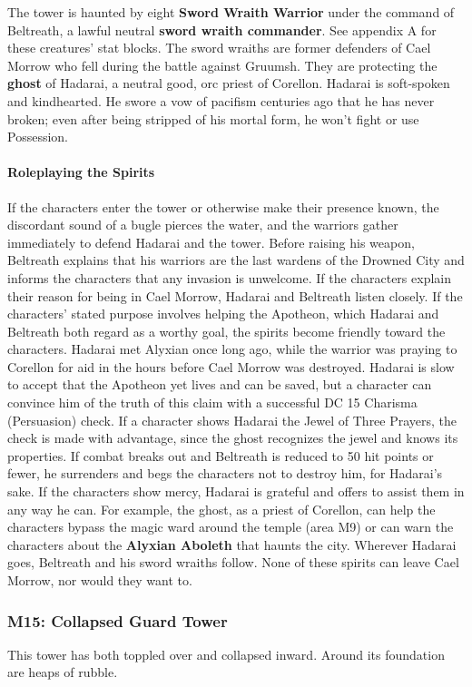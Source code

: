 \documentclass[10pt,a4,twoside,twocolumn,openany,nodeprecatedcode]{dndbook}
\begin{document}
The tower is haunted by eight \textbf{Sword Wraith Warrior} under the command of Beltreath, a lawful neutral \textbf{sword wraith commander}. See appendix A for these creatures' stat blocks.
The sword wraiths are former defenders of Cael Morrow who fell during the battle against Gruumsh. They are protecting the \textbf{ghost} of Hadarai, a neutral good, orc priest of Corellon. Hadarai is soft-spoken and kindhearted. He swore a vow of pacifism centuries ago that he has never broken; even after being stripped of his mortal form, he won't fight or use Possession.
\paragraph{Roleplaying the Spirits}
If the characters enter the tower or otherwise make their presence known, the discordant sound of a bugle pierces the water, and the warriors gather immediately to defend Hadarai and the tower.
Before raising his weapon, Beltreath explains that his warriors are the last wardens of the Drowned City and informs the characters that any invasion is unwelcome. If the characters explain their reason for being in Cael Morrow, Hadarai and Beltreath listen closely. If the characters' stated purpose involves helping the Apotheon, which Hadarai and Beltreath both regard as a worthy goal, the spirits become friendly toward the characters.
Hadarai met Alyxian once long ago, while the warrior was praying to Corellon for aid in the hours before Cael Morrow was destroyed. Hadarai is slow to accept that the Apotheon yet lives and can be saved, but a character can convince him of the truth of this claim with a successful DC 15 Charisma (Persuasion) check. If a character shows Hadarai the Jewel of Three Prayers, the check is made with advantage, since the ghost recognizes the jewel and knows its properties.
If combat breaks out and Beltreath is reduced to 50 hit points or fewer, he surrenders and begs the characters not to destroy him, for Hadarai's sake. If the characters show mercy, Hadarai is grateful and offers to assist them in any way he can. For example, the ghost, as a priest of Corellon, can help the characters bypass the magic ward around the temple (area M9) or can warn the characters about the \textbf{Alyxian Aboleth} that haunts the city.
Wherever Hadarai goes, Beltreath and his sword wraiths follow. None of these spirits can leave Cael Morrow, nor would they want to.
\subsubsection{M15: Collapsed Guard Tower}
\begin{DndReadAloud}{}
This tower has both toppled over and collapsed inward. Around its foundation are heaps of rubble.
\end{DndReadAloud}
\end{document}
